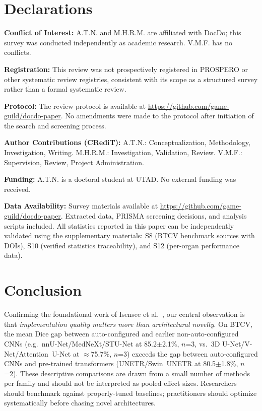 \documentclass[conference]{IEEEtran}
\begin{document}
\section*{Declarations}

\textbf{Conflict of Interest:} A.T.N. and M.H.R.M. are affiliated with DocDo; this survey was conducted independently as academic research. V.M.F. has no conflicts.

\textbf{Registration:} This review was not prospectively registered in PROSPERO or other systematic review registries, consistent with its scope as a structured survey rather than a formal systematic review.

\textbf{Protocol:} The review protocol is available at \url{https://github.com/game-guild/docdo-paper}. No amendments were made to the protocol after initiation of the search and screening process.

\textbf{Author Contributions (CRediT):} A.T.N.: Conceptualization, Methodology, Investigation, Writing. M.H.R.M.: Investigation, Validation, Review. V.M.F.: Supervision, Review, Project Administration.

\textbf{Funding:} A.T.N. is a doctoral student at UTAD. No external funding was received.

\textbf{Data Availability:} Survey materials available at \url{https://github.com/game-guild/docdo-paper}. Extracted data, PRISMA screening decisions, and analysis scripts included. All statistics reported in this paper can be independently validated using the supplementary materials: S8 (BTCV benchmark sources with DOIs), S10 (verified statistics traceability), and S12 (per-organ performance data).


\section{Conclusion}
\label{sec:conclusion}

Confirming the foundational work of Isensee et al.~\cite{isensee2021nnunet}, our central observation is that \emph{implementation quality matters more than architectural novelty}. On BTCV, the mean Dice gap between auto-configured and earlier non-auto-configured CNNs (e.g.\ nnU-Net/MedNeXt/STU-Net at 85.2$\pm$2.1\%, $n$=3, vs.\ 3D U-Net/V-Net/Attention~U-Net at $\approx$75.7\%, $n$=3) exceeds the gap between auto-configured CNNs and pre-trained transformers (UNETR/Swin~UNETR at 80.5$\pm$1.8\%, $n$=2). These descriptive comparisons are drawn from a small number of methods per family and should not be interpreted as pooled effect sizes. Researchers should benchmark against properly-tuned baselines; practitioners should optimize systematically before chasing novel architectures.
\end{document}
